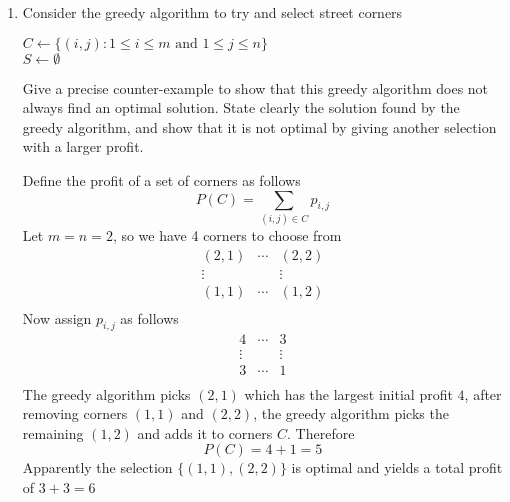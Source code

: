 \documentclass[11pt]{article}
\begin{document}
\begin{enumerate}
    \item Consider the greedy algorithm to try and select street corners \\
    \begin{algorithm}[H]
        $C \leftarrow \{ (i,j): 1 \leq i \leq m \text{ and } 1 \leq j \leq n\}$\\
        $S\leftarrow \emptyset$ \\
    \end{algorithm}
    Give a precise counter-example to show that this greedy algorithm does not always find an optimal solution. State clearly the solution found by the greedy algorithm, and show that it is not optimal by giving another selection with a larger profit.
    \begin{solution}
        Define the profit of a set of corners as follows 
        \[
            P(C) = \sum_{(i,j)\in C} p_{i,j}
        \]
        Let $m = n = 2$, so we have 4 corners to choose from 
        \[
            \begin{matrix}
                (2,1) &\cdots & (2,2) \\
                \vdots & & \vdots \\ 
                (1,1) &\cdots &(1,2)\\ 
            \end{matrix}
        \]
        Now assign $p_{i,j}$ as follows 
        \[
            \begin{matrix}
                4 &\cdots & 3 \\
                \vdots & & \vdots \\ 
                3 &\cdots & 1\\ 
            \end{matrix}
        \]
        The greedy algorithm picks $(2,1)$ which has the largest initial profit $4$, after removing corners $(1,1)$ and $(2,2)$, the greedy algorithm picks the remaining $(1,2)$ and adds it to corners $C$. Therefore 
        \[
            P(C) = 4 + 1 = 5
        \]
        Apparently the selection $\{ (1,1), (2,2) \}$ is optimal and yields a total profit of $3 + 3 = 6$ 

\end{solution}
\end{enumerate}
\end{document}
